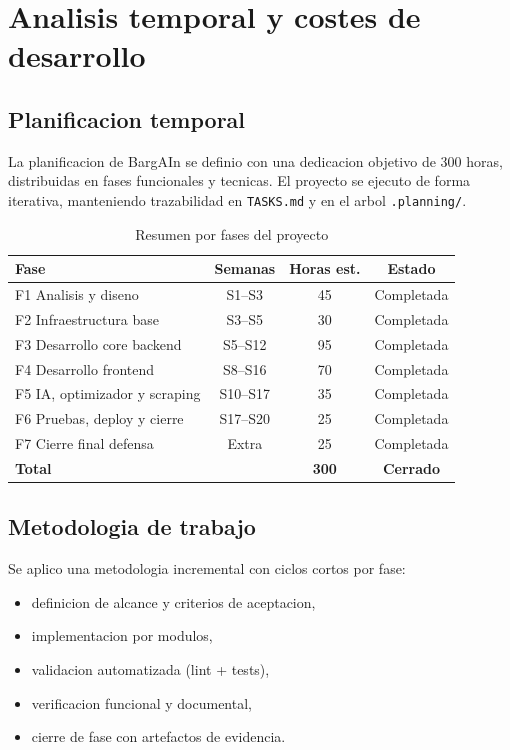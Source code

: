 \chapter{Analisis temporal y costes de desarrollo}\label{anatemporal}

\section{Planificacion temporal}

La planificacion de BargAIn se definio con una dedicacion objetivo de 300 horas,
distribuidas en fases funcionales y tecnicas. El proyecto se ejecuto de forma iterativa,
manteniendo trazabilidad en \texttt{TASKS.md} y en el arbol \texttt{.planning/}.

\begin{table}[h]
\centering
\caption{Resumen por fases del proyecto}
\label{tab:fases-temporales}
\begin{tabular}{|l|c|c|c|}
\hline
\textbf{Fase} & \textbf{Semanas} & \textbf{Horas est.} & \textbf{Estado} \\
\hline
F1 Analisis y diseno & S1--S3 & 45 & Completada \\
F2 Infraestructura base & S3--S5 & 30 & Completada \\
F3 Desarrollo core backend & S5--S12 & 95 & Completada \\
F4 Desarrollo frontend & S8--S16 & 70 & Completada \\
F5 IA, optimizador y scraping & S10--S17 & 35 & Completada \\
F6 Pruebas, deploy y cierre & S17--S20 & 25 & Completada \\
F7 Cierre final defensa & Extra & 25 & Completada \\
\hline
\textbf{Total} & & \textbf{300} & \textbf{Cerrado} \\
\hline
\end{tabular}
\end{table}

\section{Metodologia de trabajo}

Se aplico una metodologia incremental con ciclos cortos por fase:

\begin{itemize}
	\item definicion de alcance y criterios de aceptacion,
	\item implementacion por modulos,
	\item validacion automatizada (lint + tests),
	\item verificacion funcional y documental,
	\item cierre de fase con artefactos de evidencia.
\end{itemize}

